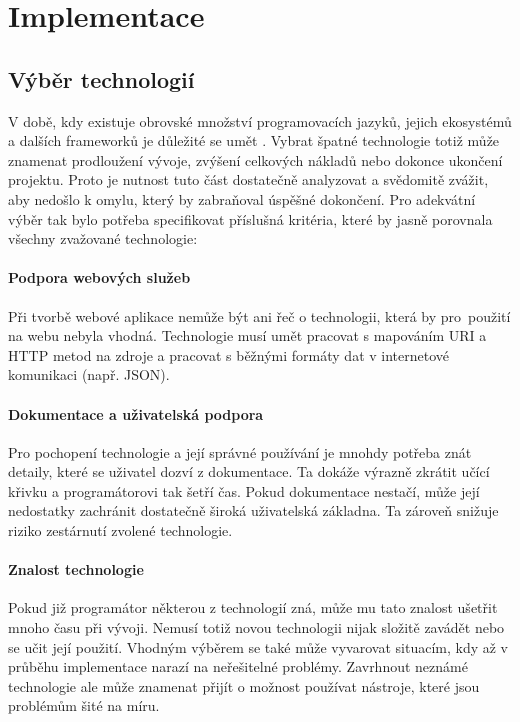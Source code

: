 \chapter{Implementace}

\section{Výběr technologií}

V době, kdy existuje obrovské množství programovacích jazyků, jejich ekosystémů a dalších frameworků je důležité se umět . 
Vybrat špatné technologie totiž může znamenat prodloužení vývoje, zvýšení celkových nákladů nebo dokonce ukončení projektu.
Proto je nutnost tuto část dostatečně analyzovat a svědomitě zvážit, aby nedošlo k omylu, který by zabraňoval úspěšné dokončení.
Pro adekvátní výběr tak bylo potřeba specifikovat příslušná kritéria, které by jasně porovnala všechny zvažované technologie:

\subsubsection*{Podpora webových služeb}
Při tvorbě webové aplikace nemůže být ani řeč o technologii, která by pro~použití na webu nebyla vhodná. Technologie musí
umět pracovat s mapováním URI a HTTP metod na zdroje a pracovat s běžnými formáty dat v internetové komunikaci (např. JSON).

\subsubsection*{Dokumentace a uživatelská podpora}
Pro pochopení technologie a její správné používání je mnohdy potřeba znát detaily, které se uživatel dozví z dokumentace.
Ta dokáže výrazně zkrátit učící křivku a programátorovi tak šetří čas. Pokud dokumentace nestačí, může její
nedostatky zachránit dostatečně široká uživatelská základna. Ta zároveň snižuje riziko zestárnutí zvolené technologie.

\subsubsection*{Znalost technologie}
Pokud již programátor některou z technologií zná, může mu tato znalost ušetřit mnoho času při vývoji. Nemusí totiž novou technologii
nijak složitě zavádět nebo se učit její použití. Vhodným výběrem se také může vyvarovat situacím, kdy až v průběhu implementace narazí
na neřešitelné problémy. Zavrhnout neznámé technologie ale může znamenat přijít o možnost používat nástroje, které jsou problémům šité na míru. 

